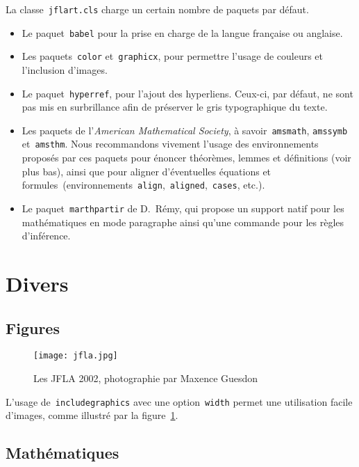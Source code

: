 \documentclass[draft]{jflart}
\begin{document}
La classe~\texttt{jflart.cls} charge un certain nombre de paquets par défaut.
%
\begin{itemize}
\item
  Le paquet~\texttt{babel} pour la prise en charge de la langue française ou
  anglaise.

\item
  Les paquets~\texttt{color} et~\texttt{graphicx}, pour permettre l'usage de
  couleurs et l'inclusion d'images.

\item
  Le paquet~\texttt{hyperref}, pour l'ajout des hyperliens.
  Ceux-ci, par défaut, ne sont pas mis en surbrillance afin de préserver le gris
  typographique du texte.

\item
  Les paquets de l'\emph{American Mathematical Society}, à
  savoir~\texttt{amsmath}, \texttt{amssymb} et~\texttt{amsthm}.
  Nous recommandons vivement l'usage des environnements proposés par ces paquets
  pour énoncer théorèmes, lemmes et définitions (voir plus bas), ainsi que pour
  aligner d'éventuelles équations et
  formules~(environnements~\texttt{align},~\texttt{aligned},~\texttt{cases},
  etc.).

\item
  Le paquet~\texttt{marthpartir} de D.~Rémy, qui propose un support natif pour
  les mathématiques en mode paragraphe ainsi qu'une commande pour les règles
  d'inférence.

\end{itemize}

\section{Divers}

\subsection{Figures}

\begin{figure}
  \centering
  \texttt{[image: jfla.jpg]}
  \caption{Les JFLA 2002, photographie par Maxence Guesdon}
  \label{fig:bienbelle}
\end{figure}

L'usage de~\texttt{includegraphics} avec une option~\texttt{width} permet une
utilisation facile d'images, comme illustré par la figure~\ref{fig:bienbelle}.

\subsection{Mathématiques}
\end{document}
